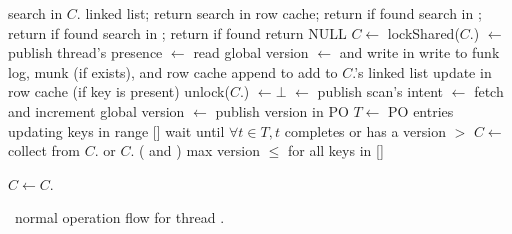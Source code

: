 \begin{algorithm}[tb]
\begin{algorithmic}[1]{}
			\State search  in $C$. linked list;  return 
		\EndIf
		\State search  in row cache; return  if found
			\State	search  in ; return  if found
		\EndIf
		\State	search  in ; return  if found
		\State return NULL	
\EndProcedure
\Statex
{}	
		\State $C \leftarrow$ 
		\State lockShared($C$.)
		\State  {}  $\leftarrow$ 
			 \Comment publish  thread's presence 
		\State {} $\leftarrow$    \Comment read global version
		\State  {}  $\leftarrow$ 
			\Comment and write in 
		\Statex \Comment write  to funk log, munk (if exists), and row cache  
		\State append  to 
			\State add   to $C$.'s linked list
		\Else
		\State update  in row cache (if key is present)
		\EndIf
		\State unlock($C$.)
		\State {}  $\leftarrow \bot$ 
\EndProcedure
\Statex
{}
		\State  {}  $\leftarrow$  \Comment publish scan's intent 
		\State {} $\leftarrow$    \Comment fetch and increment global version
		\State  {}  $\leftarrow$ 
		\Comment publish version in PO
		\State  $T \leftarrow $  PO entries updating keys in range [] 
		\State wait until $\forall t \in T, t$  completes or has a version $>$   
		\State $C \leftarrow$ 
		\Repeat
				\State collect from $C$. or $C$. ( and )
				\Statex \hspace{1cm} max version $\le$ for all keys in [] 

			\State $C \leftarrow C$. 
\EndProcedure	
\end{algorithmic}
\caption{\sys\ normal operation flow for thread .}
\label{alg:ops}
\end{algorithm}


